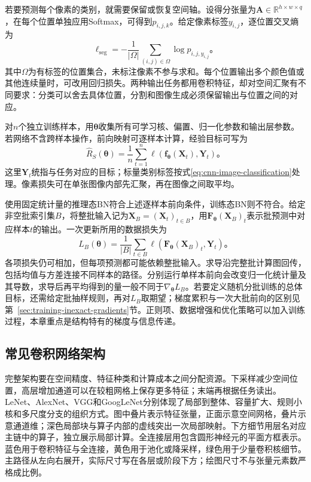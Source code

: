 若要预测每个像素的类别，就需要保留或恢复空间轴。设得分张量为$\bm A\in\mathbb R^{h\times w\times q}$，在每个位置单独应用Softmax，可得到$p_{i,j,k}$。给定像素标签$y_{i,j}$，逐位置交叉熵为
\begin{equation}
  \ell_{\mathrm{seg}}=-\frac1{|\Omega|}
    \sum_{(i,j)\in\Omega}\log p_{i,j,y_{i,j}}\text{。}
  \label{eq:cnn-segmentation-loss}
\end{equation}
其中$\Omega$为有标签的位置集合，未标注像素不参与求和。每个位置输出多个颜色值或其他连续量时，可改用回归损失。两种输出任务都用卷积特征，却对空间汇聚有不同要求：分类可以舍去具体位置，分割和图像生成必须保留输出与位置之间的对应。

对$n$个独立训练样本，用$\bm\theta$收集所有可学习核、偏置、归一化参数和输出层参数。若网络不含跨样本操作，前向映射可逐样本计算，经验目标可写为
\begin{equation}
  \widehat R_S(\bm\theta)=\frac1n\sum_{t=1}^{n}
    \ell\!\left(\bm f_{\bm\theta}(\bm X_t),\bm Y_t\right)\text{。}
  \label{eq:cnn-training-objective}
\end{equation}
这里$\bm Y_t$统指与任务对应的目标；标量类别标签按式\eqref{eq:cnn-image-classification}处理。像素损失可在单张图像内部先汇聚，再在图像之间取平均。

使用固定统计量的推理态BN符合上述逐样本前向条件，训练态BN则不符合。给定非空批索引集$B$，将整批输入记为$\bm X_B=(\bm X_t)_{t\in B}$，用$\bm F_{\bm\theta}(\bm X_B)_t$表示批预测中对应样本$t$的输出。一次更新所用的数据损失为
\begin{equation}
  L_B(\bm\theta)=\frac1{|B|}\sum_{t\in B}
    \ell\!\left(\bm F_{\bm\theta}(\bm X_B)_t,\bm Y_t\right)\text{。}
  \label{eq:cnn-batch-objective}
\end{equation}
各项损失仍可相加，但每项预测都可能依赖整批输入。求导沿完整批计算图回传，包括均值与方差连接不同样本的路径。分别运行单样本前向会改变归一化统计量及其导数，求导后再平均得到的量一般不同于$\nabla_{\bm\theta}L_B$。若要定义随机分批训练的总体目标，还需给定批抽样规则，再对$L_B$取期望；梯度累积与一次大批前向的区别见第~\ref{sec:training-inexact-gradients}节。正则项、数据增强和优化策略可以加入训练过程，本章重点是结构特有的梯度与信息传递。

\FloatBarrier

\subsection{常见卷积网络架构}
\label{sec:cnn-classic-architectures}

完整架构要在空间精度、特征种类和计算成本之间分配资源。下采样减少空间位置，高层增加通道可以在较粗网格上保存更多特征；末端再根据任务读出。LeNet、AlexNet、VGG和GoogLeNet分别体现了局部到整体、容量扩大、规则小核和多尺度分支的组织方式。图中叠片表示特征张量，正面示意空间网格，叠片示意通道维；深色局部块与算子内部的虚线突出一次局部映射。下方细节用层名对应主链中的算子，独立展示局部计算。全连接层用包含圆形神经元的平面方框表示。蓝色用于卷积特征与全连接，黄色用于池化或降采样，绿色用于少量卷积核细节。主路径从左向右展开，实际尺寸写在各层或阶段下方；绘图尺寸不与张量元素数严格成比例。

